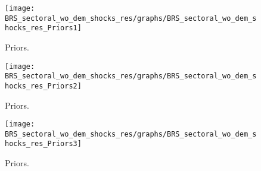  
\begin{figure}[H]
\centering
\texttt{[image: BRS\_sectoral\_wo\_dem\_shocks\_res/graphs/BRS\_sectoral\_wo\_dem\_shocks\_res\_Priors1]}
\caption{Priors.}\label{Fig:Priors:1}
\end{figure}
\begin{figure}[H]
\centering
\texttt{[image: BRS\_sectoral\_wo\_dem\_shocks\_res/graphs/BRS\_sectoral\_wo\_dem\_shocks\_res\_Priors2]}
\caption{Priors.}\label{Fig:Priors:2}
\end{figure}
\begin{figure}[H]
\centering
\texttt{[image: BRS\_sectoral\_wo\_dem\_shocks\_res/graphs/BRS\_sectoral\_wo\_dem\_shocks\_res\_Priors3]}
\caption{Priors.}\label{Fig:Priors:3}
\end{figure}
 

